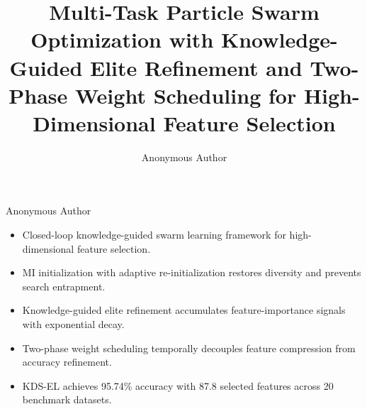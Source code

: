 \documentclass[a4paper,fleqn]{cas-dc}
\begin{document}
\par
\vspace{1.2em}
\par
\vspace{0.6em}
\noindent Anonymous Author\par
\vspace{1.5em}

\begin{itemize}\setlength{\itemsep}{10pt}
  \item Closed-loop knowledge-guided swarm learning framework for high-dimensional feature selection.
  \item MI initialization with adaptive re-initialization restores diversity and prevents search entrapment.
  \item Knowledge-guided elite refinement accumulates feature-importance signals with exponential decay.
  \item Two-phase weight scheduling temporally decouples feature compression from accuracy refinement.
  \item KDS-EL achieves 95.74\% accuracy with 87.8 selected features across 20 benchmark datasets.
\end{itemize}

\clearpage


\title[mode=title]{Multi-Task Particle Swarm Optimization with Knowledge-Guided Elite Refinement and Two-Phase Weight Scheduling for High-Dimensional Feature Selection}

\author[1]{Anonymous Author}
\cormark[1]
\address[1]{School of Computer Science, Anonymous University, Anonymous City, China}
\end{document}
